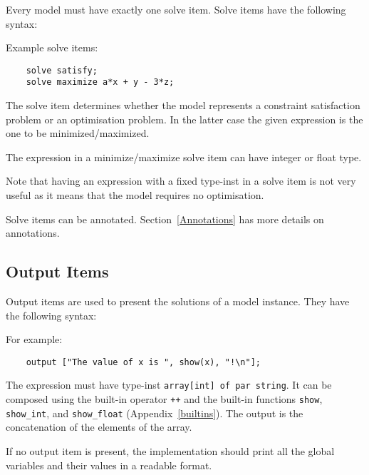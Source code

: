 \documentclass[10pt]{scrartcl}
\begin{document}
Every model must have exactly one solve item.  Solve items have the
following syntax:
\begin{productions}
    \RuleSolveItem
\end{productions}
Example solve items:
\begin{verbatim}
    solve satisfy;
    solve maximize a*x + y - 3*z;
\end{verbatim}

The solve item determines whether the model represents a constraint
satisfaction problem or an optimisation problem.  In the latter case the
given expression is the one to be minimized/maximized.

The expression in a minimize/maximize solve item can have integer or float type.

Note that having an expression with a fixed type-inst in a solve item is not
very useful as it means that the model requires no optimisation.

Solve items can be annotated.  Section~\ref{Annotations} has more details on
annotations.

\subsection{Output Items}
     \label{Output Items}
Output items are used to present the solutions of a model instance.
They have the following syntax:
\begin{productions}
    \RuleOutputItem
\end{productions}
For example:
\begin{verbatim}
    output ["The value of x is ", show(x), "!\n"];
\end{verbatim}

The expression must have type-inst \texttt{array[int] of par string}.  It
can be composed using the built-in operator \texttt{++}
and the built-in functions \texttt{show}, \texttt{show\_int}, and
\texttt{show\_float} 
(Appendix~\ref{builtins}).
The output is the concatenation of the elements of the array.

If no output item is present,
the implementation should print all the global variables and their values
in a readable format.


\end{document}
